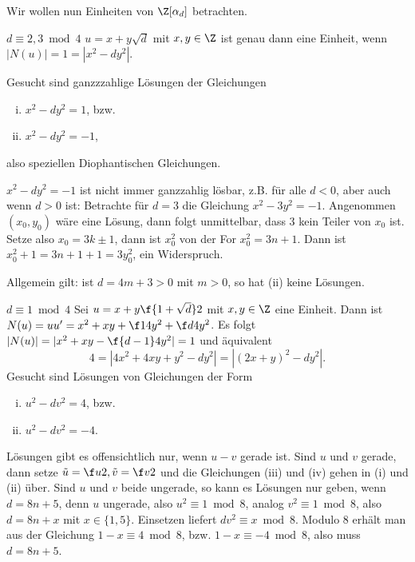 \begin{nt} \label{4.16}
	Wir wollen nun Einheiten von $\Z[\alpha_d]$ betrachten.
	\begin{seg}{$d \equiv 2, 3 \bmod 4$}
		$u = x + y \sqrt d$ mit $x, y \in \Z$ ist genau dann eine Einheit, wenn $|N(u)| = 1 = |x^2 - dy^2|$.

		Gesucht sind ganzzzahlige Lösungen der Gleichungen
		\begin{enumerate}[(i)]
			\item
				$x^2 - dy^2 = 1$, bzw.
			\item
				$x^2 - dy^2 = -1$,
		\end{enumerate}
		also speziellen Diophantischen Gleichungen.

		$x^2 - dy^2 = -1$ ist nicht immer ganzzahlig lösbar, z.B. für alle $d < 0$, aber auch wenn $d > 0$ ist:
		Betrachte für $d = 3$ die Gleichung $x^2 - 3y^2 = - 1$.
		Angenommen $(x_0, y_0)$ wäre eine Lösung, dann folgt unmittelbar, dass $3$ kein Teiler von $x_0$ ist.
		Setze also $x_0 = 3k \pm 1$, dann ist $x_0^2$ von der For $x_0^2 = 3n + 1$.
		Dann ist $x_0^2 + 1 = 3n + 1 + 1 = 3y_0^2$, ein Widerspruch.

		Allgemein gilt: ist $d = 4m + 3 > 0$ mit $m > 0$, so hat (ii) keine Lösungen.
	\end{seg}
	\begin{seg}{$d \equiv 1 \bmod 4$}
		Sei $u = x + y \f {1 + \sqrt d}2$ mit $x,y \in \Z$ eine Einheit.
		Dann ist $N(u) = u u' = x^2 + xy + \f 14 y^2 + \f d4 y^2$.
		Es folgt $|N(u)| = |x^2 + xy - \f {d-1}4 y^2| = 1$ und äquivalent
		\[
			4 = | 4 x^2 + 4xy + y^2 - dy^2 |
			= | (2x + y)^2 - dy^2 |.
		\]
		Gesucht sind Lösungen von Gleichungen der Form
		\begin{enumerate}[(i), start=3]
			\item
				$u^2 - dv^2 = 4$, bzw.
			\item
				$u^2 - dv^2 = -4$.
		\end{enumerate}
		Lösungen gibt es offensichtlich nur, wenn $u - v$ gerade ist.
		Sind $u$ und $v$ gerade, dann setze $\tilde u = \f u2, \tilde v = \f v2$ und die Gleichungen (iii) und (iv) gehen in (i) und (ii) über.
		Sind $u$ und $v$ beide ungerade, so kann es Lösungen nur geben, wenn $d = 8n + 5$, denn $u$ ungerade, also $u^2 \equiv 1 \bmod 8$, analog $v^2 \equiv 1 \bmod 8$, also $d = 8n + x$ mit $x \in \{1, 5\}$.
		Einsetzen liefert $dv^2 \equiv x \bmod 8$.
		Modulo $8$ erhält man aus der Gleichung $1 - x \equiv 4 \bmod 8$, bzw. $1 - x \equiv -4 \bmod 8$, also muss $d = 8n + 5$.
	\end{seg}
\end{nt}

